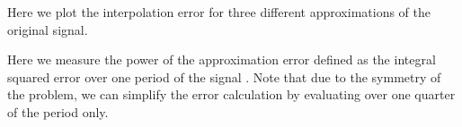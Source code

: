 \documentclass{article}
\begin{document}
\begin{CellGroup}
\begin{CellGroup}
\end{CellGroup}
Here we plot the interpolation error for three different approximations of the original signal.

\begin{CellGroup}
\begin{CellGroup}

\end{CellGroup}

\end{CellGroup}
Here we measure the power of the approximation error  defined as the integral squared error over one period of the signal .
Note that due to the symmetry of the problem, we can simplify the error calculation by evaluating over one quarter of the period only.



\begin{CellGroup}


\end{CellGroup}
\end{CellGroup}
\end{document}
